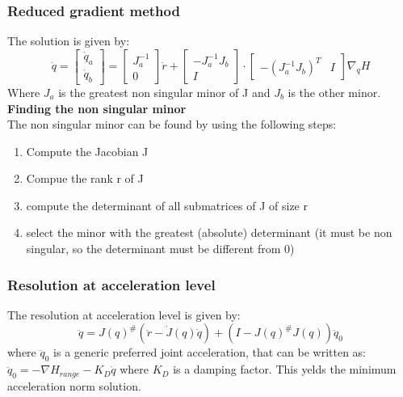 \documentclass[a4paper,12pt]{article}
\begin{document}
    \subsubsection{Reduced gradient method}\label{sec:Reduced gradient method}
     The solution is
     given by: \begin{equation}
        \dot{q} = \begin{bmatrix}
            \dot{q}_a \\
            \dot{q}_b
        \end{bmatrix} = \begin{bmatrix}
            J_a^{-1} \\
            0 
        \end{bmatrix}\dot{r}
        + \begin{bmatrix}
            -J_a^{-1} J_b \\ 
            I
        \end{bmatrix} \cdot \begin{bmatrix} 
            -(J_a^{-1}J_b)^T & I
        \end{bmatrix} \nabla _q H
    \end{equation}
    Where $J_a$ is the greatest non singular minor of J and $J_b$ is 
    the other minor. \\
    \textbf{Finding the non singular minor} \\
    The non singular minor can be found by using the following steps:
    \begin{enumerate}
        \item Compute the Jacobian J 
        \item Compue the rank r of J
        \item compute the determinant of all submatrices of J of size r
        \item select the minor with the greatest (absolute) determinant (it must be 
        non singular, so the determinant must be different from 0)
    \end{enumerate}
    \subsubsection{Resolution at acceleration level}\label{sec:Resolution at acceleration level}
    The resolution at acceleration level is given by:
    \begin{equation}
        \ddot{q} = J(q)^{\#}(\ddot{r}-\dot{J}(q)\dot{q}) + (I - J(q)^{\#}J(q))\ddot{q}_0
    \end{equation}
    where $\ddot{q}_0$ is a generic preferred joint acceleration, that can be 
    written as: $\ddot{q}_0 = - \nabla H_{range} - K_D \dot{q}$ where $K_D$ is a damping factor.
    This yelds the minimum acceleration norm solution.
\end{document}
